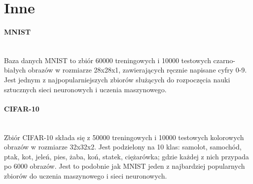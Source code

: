 \section{Inne}

\paragraph{MNIST} \mbox{}\\
Baza danych MNIST \cite{MNIST} to zbiór 60000 treningowych i 10000 testowych czarno-białych obrazów
w rozmiarze 28x28x1, zawierających ręcznie napisane cyfry 0-9. Jest jednym z
najpopularniejszych zbiorów służących do rozpoczęcia nauki sztucznych sieci neuronowych
i uczenia maszynowego.

\paragraph{CIFAR-10} \mbox{}\\
Zbiór CIFAR-10 \cite{CIFAR-10} składa się z 50000 treningowych i 10000 testowych kolorowych obrazów w rozmiarze
32x32x2. Jest podzielony na 10 klas: samolot, samochód, ptak, kot, jeleń, pies, żaba,
koń, statek, ciężarówka; gdzie każdej z nich przypada po 6000 obrazów. Jest to podobnie
jak MNIST jeden z najbardziej popularnych zbiorów do uczenia maszynowego i sieci neuronowych.
